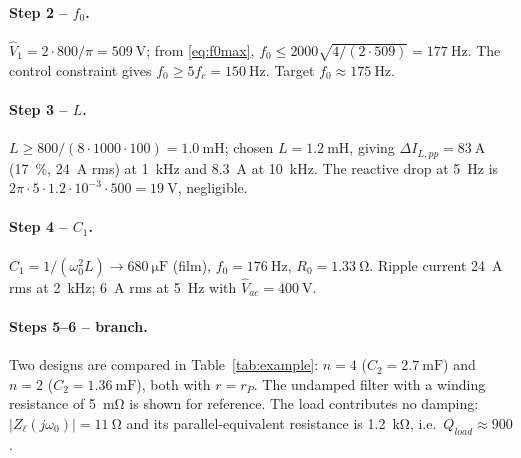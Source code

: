 \documentclass[11pt,a4paper]{article}
\begin{document}
\paragraph{Step 2 -- $f_0$.} $\hat V_1 = 2 \cdot 800/\pi = \SI{509}{\volt}$;
from \eqref{eq:f0max}, $f_0 \le 2000\sqrt{4/(2\cdot 509)} = \SI{177}{\hertz}$. The
control constraint gives $f_0 \ge 5 f_c = \SI{150}{\hertz}$. Target $f_0 \approx \SI{175}{\hertz}$.

\paragraph{Step 3 -- $L$.} $L \ge 800/(8 \cdot 1000 \cdot 100) = \SI{1.0}{\milli\henry}$;
chosen $L = \SI{1.2}{\milli\henry}$, giving $\Delta I_{L,pp} = \SI{83}{\ampere}$
(\SI{17}{\percent}, \SI{24}{\ampere} rms) at \SI{1}{\kilo\hertz} and \SI{8.3}{\ampere}
at \SI{10}{\kilo\hertz}. The reactive drop at \SI{5}{\hertz} is
$2\pi\cdot 5\cdot 1.2\cdot 10^{-3}\cdot 500 = \SI{19}{\volt}$, negligible.

\paragraph{Step 4 -- $C_1$.} $C_1 = 1/(\omega_0^2 L) \to \SI{680}{\micro\farad}$ (film),
$f_0 = \SI{176}{\hertz}$, $R_0 = \SI{1.33}{\ohm}$. Ripple current \SI{24}{\ampere} rms at
\SI{2}{\kilo\hertz}; \SI{6}{\ampere} rms at \SI{5}{\hertz} with $\hat V_{ac} = \SI{400}{\volt}$.

\paragraph{Steps 5--6 -- branch.} Two designs are compared in Table~\ref{tab:example}:
$n = 4$ ($C_2 = \SI{2.7}{\milli\farad}$) and $n = 2$ ($C_2 = \SI{1.36}{\milli\farad}$),
both with $r = r_P$. The undamped filter with a winding resistance of \SI{5}{\milli\ohm}
is shown for reference. The load contributes no damping:
$|Z_\ell(j\omega_0)| = \SI{11}{\ohm}$ and its parallel-equivalent resistance is
\SI{1.2}{\kilo\ohm}, i.e.\ $Q_{load} \approx 900$.
\end{document}
